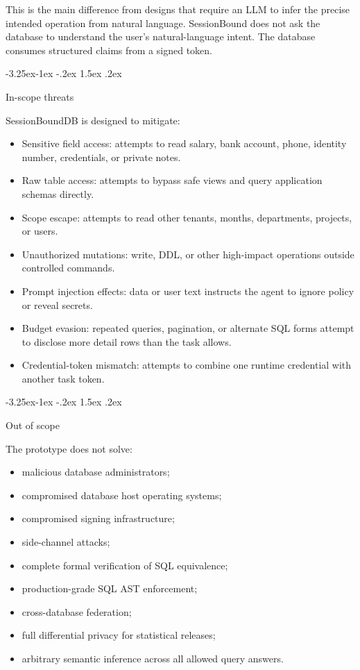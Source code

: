 \documentclass[10pt,twocolumn]{article}
\makeatletter
\providecommand{\tightlist}{%
  \setlength{\itemsep}{0pt}\setlength{\parskip}{0pt}}
\renewcommand\subsection{\@startsection{subsection}{2}{\z@}%
  {-3.25ex\@plus -1ex \@minus -.2ex}%
  {1.5ex \@plus .2ex}%
  {\normalfont\large\bfseries\raggedright}}
\makeatother
\begin{document}
This is the main difference from designs that require an LLM to infer
the precise intended operation from natural language. SessionBound does
not ask the database to understand the user's natural-language intent.
The database consumes structured claims from a signed token.

\hypertarget{in-scope-threats}{%
\subsection{In-scope threats}\label{in-scope-threats}}

SessionBoundDB is designed to mitigate:

\begin{itemize}
\tightlist
\item
  Sensitive field access: attempts to read salary, bank
  account, phone, identity number, credentials, or private notes.
\item
  Raw table access: attempts to bypass safe views and query
  application schemas directly.
\item
  Scope escape: attempts to read other tenants, months,
  departments, projects, or users.
\item
  Unauthorized mutations: write, DDL, or other high-impact operations
  outside controlled commands.
\item
  Prompt injection effects: data or user text instructs the
  agent to ignore policy or reveal secrets.
\item
  Budget evasion: repeated queries, pagination, or alternate
  SQL forms attempt to disclose more detail rows than the task allows.
\item
  Credential-token mismatch: attempts to combine one runtime
  credential with another task token.
\end{itemize}

\hypertarget{out-of-scope}{%
\subsection{Out of scope}\label{out-of-scope}}

The prototype does not solve:

\begin{itemize}
\tightlist
\item
  malicious database administrators;
\item
  compromised database host operating systems;
\item
  compromised signing infrastructure;
\item
  side-channel attacks;
\item
  complete formal verification of SQL equivalence;
\item
  production-grade SQL AST enforcement;
\item
  cross-database federation;
\item
  full differential privacy for statistical releases;
\item
  arbitrary semantic inference across all allowed query answers.
\end{itemize}
\end{document}

